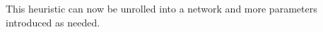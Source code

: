 \documentclass{article}
\begin{document}
This heuristic can now be unrolled into a network and more parameters introduced as needed.


\end{document}

